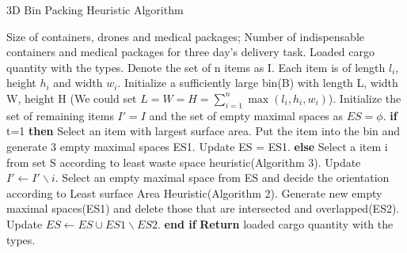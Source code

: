 \documentclass{mcmthesis}
\begin{document}
\begin{algorithm}
	\label{al1}
	\renewcommand{\algorithmicrequire}{\textbf{Input:}}
	\renewcommand{\algorithmicensure}{\textbf{Output: }}
	\caption{3D Bin Packing Heuristic Algorithm}
	\begin{algorithmic}[1]
		\REQUIRE  Size of containers, drones and medical packages; Number of indispensable containers and medical packages for three day's delivery task.
		\ENSURE Loaded cargo quantity with the types.
		\STATE Denote the set of n items as I. Each item is of length $l_i$, height $h_i$ and width $w_i$. 
		\STATE Initialize a sufficiently large bin(B) with length L, width W, height H (We could set 
		$L = W = H = \sum\limits_{i = 1}^n {\max ({l_i},{h_i},{w_i})} $).
		\STATE Initialize the set of remaining items $I' = I$ and the set of empty maximal spaces as $ES = \phi$.
		\STATE   \textbf{if} t=1 \textbf{then}
		\STATE   Select an item with largest surface area.
		\STATE Put the item into the    bin and generate 3 empty maximal spaces ES1. Update ES = ES1.
		\STATE  \textbf{else}
		\STATE Select a item i from set S according to least waste space heuristic(Algorithm 3). Update 
		$ I' \leftarrow I'\backslash i$.
		\STATE  Select an empty maximal space from ES and decide the orientation according to Least surface Area Heuristic(Algorithm 2). 
 		\STATE  Generate new empty maximal spaces(ES1) and delete those that are intersected and overlapped(ES2). Update $ES \leftarrow ES \cup ES1\backslash ES2$.
 		\STATE \textbf{end if}
		\ENDFOR
		\STATE \textbf{Return} loaded cargo quantity with the types.

	\end{algorithmic}  
\end{algorithm}
\end{document}
